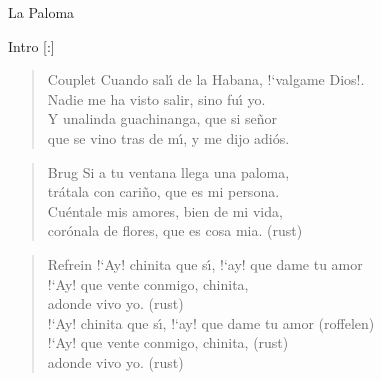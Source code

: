 \begin{song}[tango]{La Paloma}

%
%
\begin{instrumental}{Intro}
\measure{}\measure{}[:] 
\end{instrumental}

\begin{verse}{Couplet}
Cuando sal\'{\i} de la Habana, !`valgame Dios!.\\
Nadie me ha visto salir, sino fu\'{\i} yo.\\
Y unalinda guachinanga, que si se\~{n}or\\
que se vino tras de m\'{\i}, y me dijo adi\'{o}s.
\end{verse}

\begin{verse}{Brug}
Si a tu ventana llega una paloma,\\
tr\'{a}tala con cari\~{n}o, que es mi persona.\\
Cu\'{e}ntale mis amores, bien de mi vida,\\
cor\'{o}nala de flores, que es cosa mia. \hspace{3em}(rust)
\end{verse}

\begin{verse}{Refrein}
!`Ay! chinita que s\'{\i}, !`ay! que dame tu amor\\
!`Ay! que vente conmigo, chinita,\chord{}\\ %
adonde vivo yo. \hspace{3em}(rust)\\
\vspace*{1\baselineskip}
!`Ay! chinita que s\'{\i}, !`ay! que dame tu amor \hspace{1em}(roffelen)\\
!`Ay! que vente conmigo, chinita,  \hspace{5em}(rust)\\
adonde vivo yo. \hspace{3em}(rust)
\end{verse}


\vspace{2ex}\vspace{-2.5ex}
\end{song}

